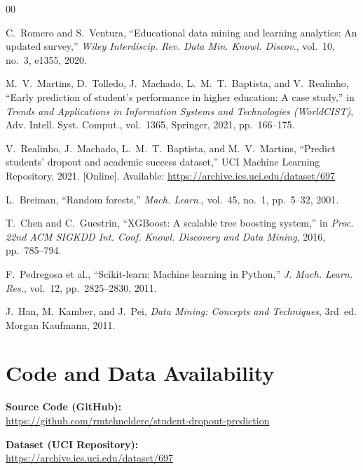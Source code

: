 \documentclass[conference]{IEEEtran}
\begin{document}
	\begin{thebibliography}{00}
		
		 C.~Romero and S.~Ventura, ``Educational data mining and learning analytics: An updated survey,'' \textit{Wiley Interdiscip. Rev. Data Min. Knowl. Discov.}, vol.~10, no.~3, e1355, 2020.
		
		 M.~V.~Martins, D.~Tolledo, J.~Machado, L.~M.~T.~Baptista, and V.~Realinho, ``Early prediction of student's performance in higher education: A case study,'' in \textit{Trends and Applications in Information Systems and Technologies (WorldCIST)}, Adv. Intell. Syst. Comput., vol.~1365, Springer, 2021, pp.~166--175.
		
		 V.~Realinho, J.~Machado, L.~M.~T.~Baptista, and M.~V.~Martins, ``Predict students' dropout and academic success dataset,'' UCI Machine Learning Repository, 2021. [Online]. Available: \url{https://archive.ics.uci.edu/dataset/697}
		
		 L.~Breiman, ``Random forests,'' \textit{Mach. Learn.}, vol.~45, no.~1, pp.~5--32, 2001.
		
		 T.~Chen and C.~Guestrin, ``XGBoost: A scalable tree boosting system,'' in \textit{Proc. 22nd ACM SIGKDD Int. Conf. Knowl. Discovery and Data Mining}, 2016, pp.~785--794.
		
		 F.~Pedregosa et al., ``Scikit-learn: Machine learning in Python,'' \textit{J. Mach. Learn. Res.}, vol.~12, pp.~2825--2830, 2011.
		
		 J.~Han, M.~Kamber, and J.~Pei, \textit{Data Mining: Concepts and Techniques}, 3rd~ed. Morgan Kaufmann, 2011.
		
	\end{thebibliography}
	
	\newpage	
	\appendix
	
	\section{Code and Data Availability}
	\label{app:code}
	
	\noindent\textbf{\textcolor{linkgreen}{Source Code (GitHub):}}\\
	\textcolor{linkblue}{\url{https://github.com/rmtehneldere/student-dropout-prediction}}
	
	\vspace{4pt}
	\noindent\textbf{\textcolor{linkgreen}{Dataset (UCI Repository):}}\\
	\textcolor{linkblue}{\url{https://archive.ics.uci.edu/dataset/697}}
	
\end{document}
